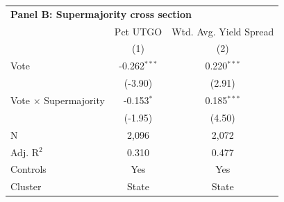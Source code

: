 \begingroup
\centering
\begin{tabular*}{\textwidth}{@{\extracolsep{\fill}}lcc}
\multicolumn{3}{l}{\textbf{Panel B: Supermajority cross section}}\\

\addlinespace
   \toprule
                                & Pct UTGO       & Wtd. Avg. Yield Spread\\  
                                & (1)            & (2)\\  
   \midrule 
   Vote                         & -0.262$^{***}$ & 0.220$^{***}$\\   
                                & (-3.90)       & (2.91)\\   
   Vote $\times$ Supermajority  & -0.153$^{*}$   & 0.185$^{***}$\\   
                                & (-1.95)       & (4.50)\\   
   \hline
   N                 & 2,096          & 2,072\\  
   Adj. R$^2$               & 0.310          & 0.477\\  
   Controls                   & Yes            & Yes\\
   Cluster              & State & State\\  
   \bottomrule
\end{tabular*}
\par\endgroup
